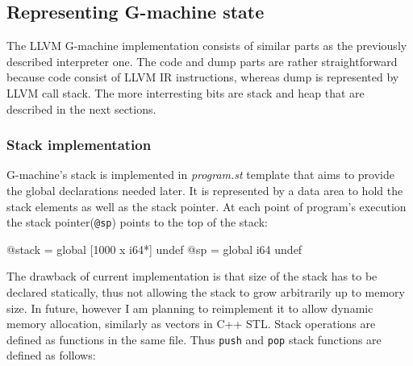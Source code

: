 \documentclass[12pt,a4paper]{report}
\begin{document}
\subsection{Representing G-machine state}
The LLVM G-machine implementation consists of similar parts as the previously
described interpreter one. The code and dump parts are rather straightforward
because code consist of LLVM IR instructions, whereas dump is represented by
LLVM call stack. The more interresting bits are stack and heap that are
described in the next sections.

\subsubsection{Stack implementation}
G-machine's stack is implemented in \textit{program.st} template that aims to
provide the global declarations needed later. It is represented by a data area
to hold the stack elements as well as the stack pointer. At each point of
program's execution the stack pointer(\texttt{@sp}) points to the top of the
stack:

\vspace*{0.2in}
\begin{code}[style=assembler]
  @stack = global [1000 x i64*] undef
  @sp = global i64 undef
\end{code}

The drawback of current implementation is that size of the stack has to be
declared statically, thus not allowing the stack to grow arbitrarily up to
memory size. In future, however I am planning to reimplement it to allow dynamic
memory allocation, similarly as vectors in C++ STL. Stack operations are
defined as functions in the same file. Thus \texttt{push} and \texttt{pop}
stack functions are defined as follows:

\vspace*{0.2in}
\end{document}
